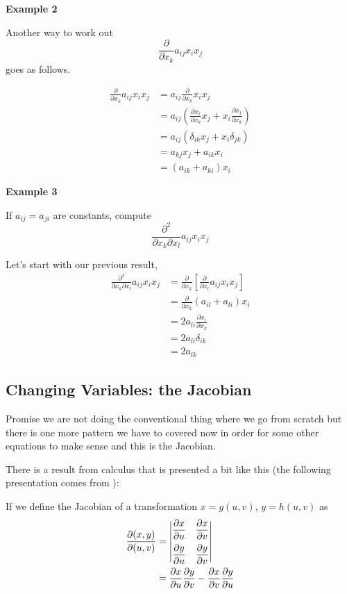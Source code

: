 \textbf{Example 2}

Another way to work out
$$
\frac{\partial}{\partial x_k} a_{ij} x_i x_j
$$
goes as follows.

\begin{align*}
\frac{\partial}{\partial x_k} a_{ij} x_i x_j &= a_{ij} \frac{\partial}{\partial x_k} x_i x_j \\
&= a_{ij} \left( \frac{\partial x_i}{\partial x_k} x_j + x_i \frac{\partial x_j}{\partial x_k} \right) \\
&= a_{ij} \left( \delta_{ik} x_j + x_i \delta_{jk} \right) \\
&= a_{kj} x_j + a_{ik} x_i \\
&= (a_{ik} + a_{ki}) x_i
\end{align*}


\textbf{Example 3}

If $a_{ij} = a_{ji}$ are constants, compute
$$
\frac{\partial^2}{\partial x_k \partial x_l} a_{ij} x_i x_j
$$

Let's start with our previous result,
\begin{align*}
\frac{\partial^2}{\partial x_k \partial x_l} a_{ij} x_i x_j &=
    \frac{\partial}{\partial x_k} \left[ \frac{\partial}{\partial x_l} a_{ij} x_i x_j \right] \\
&= \frac{\partial}{\partial x_k} (a_{il} + a_{li}) x_i \\
&= 2 a_{li} \frac{\partial x_i}{\partial x_k} \\
&= 2 a_{li} \delta_{ik} \\
&= 2 a_{lk}
\end{align*}



\subsection{Changing Variables: the Jacobian}


Promise we are not doing the conventional thing where we go from scratch but there is one more pattern we have to covered
now in order for some other equations to make sense and this is the Jacobian.


There is a result from calculus that is presented a bit like this (the following presentation comes from
\cite{jacobian}):


If we define the Jacobian of a transformation $x = g(u,v)$, $y = h(u,v)$ as
\begin{align*}
\frac{ \partial (x,y) }{ \partial (u,v) } &= 
\begin{vmatrix}
\dfrac{ \partial x }{ \partial u } & \dfrac{ \partial x }{ \partial v } \\ \addlinespace
\dfrac{ \partial y }{ \partial u } & \dfrac{ \partial y }{ \partial v }
\end{vmatrix} \\
&= \frac{ \partial x }{ \partial u } \frac{ \partial y }{ \partial v } -
    \frac{ \partial x }{ \partial v }\frac{ \partial y }{ \partial u }
\end{align*}

